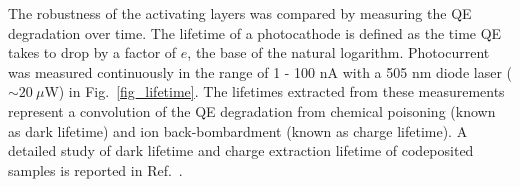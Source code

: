 
	


The robustness of the activating layers was compared by measuring the QE degradation over time. The lifetime of a photocathode is defined as the time QE takes to drop by a factor of $e$, the base of the natural logarithm.\cite{bae2018_RuggedSpinpolarizedElectron,grames2011_ChargeFluenceLifetime} 
Photocurrent was measured continuously in the range of 1 - 100 nA with a 505 nm diode laser ($\sim 20 \: \mu$W) in Fig.~\ref{fig_lifetime}. The lifetimes extracted from these measurements represent a convolution of the QE degradation from chemical poisoning (known as dark lifetime) and ion back-bombardment (known as charge lifetime).
A detailed study of dark lifetime and charge extraction lifetime of codeposited samples is reported in Ref.~\cite{cultrera2020_LongLifetimePolarized}.

